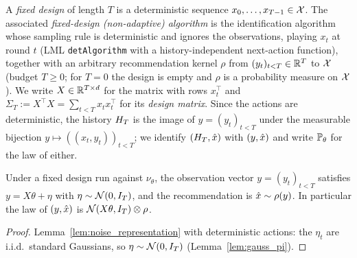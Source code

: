 \begin{definition}\label{def:fixed_design}
\leanok
{}
A \emph{fixed design} of length $T$ is a deterministic sequence $x_0, \dots, x_{T-1} \in \mathcal{X}$.
The associated \emph{fixed-design (non-adaptive) algorithm} is the identification algorithm
whose sampling rule is deterministic and ignores the observations, playing $x_t$ at round
$t$ (LML \texttt{detAlgorithm} with a history-independent next-action function), together with
an arbitrary recommendation kernel $\rho$ from $(y_t)_{t<T} \in \mathbb{R}^T$ to $\mathcal{X}$ (budget
$T \ge 0$; for $T = 0$ the design is empty and $\rho$ is a probability measure on $\mathcal{X}$). We write
$X \in \mathbb{R}^{T \times d}$ for the matrix with rows $x_t^\top$ and
$\Sigma_T := X^\top X = \sum_{t<T} x_t x_t^\top$ for its \emph{design matrix}. Since the actions
are deterministic, the history $H_T$ is the image of $y = (y_t)_{t<T}$ under the measurable
bijection $y \mapsto ((x_t, y_t))_{t<T}$; we identify $(H_T, \hat{x})$ with $(y, \hat{x})$ and
write $\mathbb{P}_\theta$ for the law of either.
\end{definition}

\begin{lemma}\label{lem:fixed_design_law}
\leanok
{}
Under a fixed design run against $\nu_\theta$, the observation vector
$y = (y_t)_{t<T}$ satisfies $y = X\theta + \eta$ with $\eta \sim \mathcal{N}(0, I_T)$, and
the recommendation is $\hat{x} \sim \rho(y)$. In particular the law of $(y, \hat{x})$ is
$\mathcal{N}(X\theta, I_T) \otimes \rho$.
\end{lemma}

\begin{proof}
\leanok
{}
Lemma~\ref{lem:noise_representation} with deterministic actions: the $\eta_t$ are i.i.d.\
standard Gaussians, so $\eta \sim \mathcal{N}(0,I_T)$ (Lemma~\ref{lem:gauss_pi}).
\end{proof}


